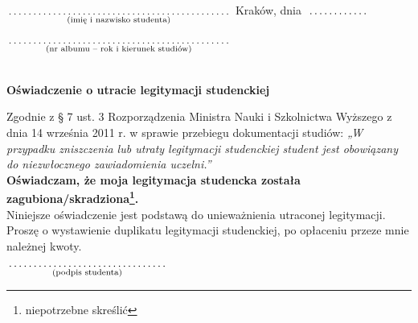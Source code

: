 \documentclass[a4paper,11pt]{article}
\newcommand{\fillField}[2]{
    $\underset{\text{#1}}{\parbox[t]{#2}{\dotfill}}$
}
\begin{document}
\noindent
\fillField{(imię i nazwisko studenta)}{7cm} \hfill Kraków, dnia \fillField{}{2cm} \\\\
\fillField{(nr albumu – rok i kierunek studiów)}{7cm} \\\\

\vskip 1.0cm
\begin{center}
{\Large \textbf{Oświadczenie o utracie legitymacji studenckiej}}
\end{center}
\vskip 0.5cm

Zgodnie z § 7 ust. 3 Rozporządzenia Ministra Nauki i Szkolnictwa Wyższego z dnia 14 września 2011 r. w sprawie przebiegu dokumentacji studiów: \textit{„W przypadku zniszczenia lub utraty legitymacji studenckiej student jest obowiązany do niezwłocznego zawiadomienia uczelni.”} \\

\noindent
\textbf{Oświadczam, że moja legitymacja studencka została zagubiona/skradziona\footnote[1]{niepotrzebne skreślić}.} \\

\noindent
Niniejsze oświadczenie jest podstawą do unieważnienia utraconej legitymacji. \\

\noindent
Proszę o wystawienie duplikatu legitymacji studenckiej, po opłaceniu przeze mnie należnej kwoty.

\vskip 1.2cm
\hspace{\fill} \fillField{(podpis studenta)}{5cm} \hspace{2.0cm}
\end{document}

